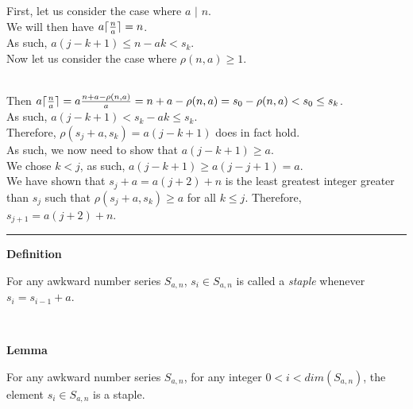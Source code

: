 \documentclass[a4paper,12pt]{article}
\DeclarePairedDelimiter{\ceil}{\lceil}{\rceil}
\begin{document}
\noindent First, let us consider the case where $a$ $|$ $n$.\\

\noindent We will then have $a \ceil{\frac{n}{a}} = n$.\\

\noindent As such, $a(j - k + 1) \leq n - ak < s_k$.\\

\noindent Now let us consider the case where $\rho(n, a) \geq 1$.\\\

\noindent Then $a \ceil{\frac{n}{a}} = a \frac{n + a - \rho(n, a)}{a} = n + a - \rho(n, a) = s_0 - \rho(n, a) < s_0 \leq s_k$.\\

\noindent As such, $a(j - k + 1) < s_k - ak \leq s_k$.\\

\noindent Therefore, $\rho(s_j + a, s_k) = a(j - k + 1)$ does in fact hold.\\

\noindent As such, we now need to show that $a(j - k + 1) \geq a$.\\

\noindent We chose $k < j$, as such, $a(j - k + 1) \geq a(j - j + 1) = a$.\\

\noindent We have shown that $s_j + a = a(j + 2) + n$ is the least greatest integer greater than $s_j$ such that $\rho(s_j + a, s_k) \geq a$ for all $k \leq j$. Therefore, $s_{j+1} = a(j + 2) + n$.

\begin{center}
\noindent\rule{8cm}{0.4pt}
\end{center}




\label{definition:staple}
\hypertarget{definition:staple}{}
\begin{tcolorbox}
\textbf{Definition}

For any awkward number series $S_{a,n}$, $s_i \in S_{a, n}$ is called a \textit{staple} whenever $s_i = s_{i - 1} + a$.

\end{tcolorbox}
\noindent \\






\label{lemma:initial_staples}
\hypertarget{lemma:initial_staples}{}
\begin{tcolorbox}
\textbf{Lemma}

For any awkward number series $S_{a,n}$, for any integer $0 < i < dim(S_{a,n})$, the element $s_i \in S_{a,n}$ is a staple.

\end{tcolorbox}
\end{document}
